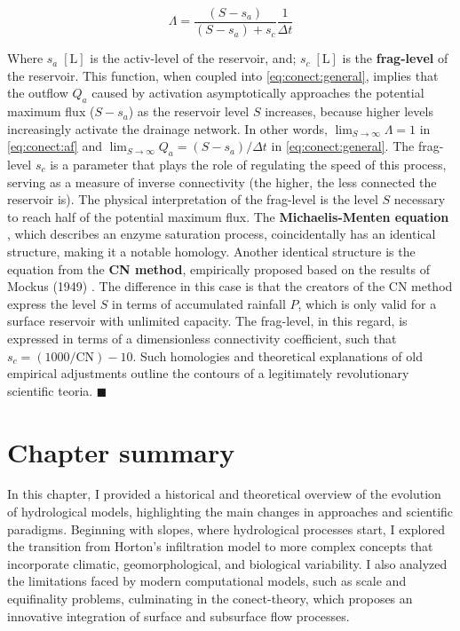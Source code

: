 \documentclass[./main_en.tex]{subfiles}
\begin{document}
\begin{linenomath*}
\begin{equation} 
	\label{eq:conect:af}
	\Lambda = \frac{(S - s_a)}{(S - s_a) + s_c} \frac{1}{\Delta t}
\end{equation}
\end{linenomath*}
Where $s_{a}\;[\text{L}]$ is the \gls{activ-level} of the reservoir, and;  $s_{c}\;[\text{L}]$ is the \textbf{\gls{frag-level}} of the reservoir. This function, when coupled into \eqref{eq:conect:general}, implies that the outflow $Q_a$ caused by activation asymptotically approaches the potential maximum flux ($S - s_a$) as the reservoir level $S$ increases, because higher levels increasingly activate the drainage network. In other words, $\lim _{S \to \infty} \Lambda= 1$ in \eqref{eq:conect:af} and $\lim _{S \to \infty} Q_a = (S - s_a)/ \Delta t$ in \eqref{eq:conect:general}. The \gls{frag-level} $s_c$ is a parameter that plays the role of regulating the speed of this process, serving as a measure of inverse connectivity (the higher, the less connected the reservoir is). The physical interpretation of the \gls{frag-level} is the level $S$ necessary to reach half of the potential maximum flux. The \textbf{Michaelis-Menten equation} \cite{Johnson2011a}, which describes an enzyme saturation process, coincidentally has an identical structure, making it a notable \gls{homology}. Another identical structure is the equation from the \textbf{CN method}, empirically proposed based on the results of Mockus (1949) \cite{mockus1949}. The difference in this case is that the creators of the CN method express the level $S$ in terms of accumulated rainfall $P$, which is only valid for a surface reservoir with unlimited capacity. The \gls{frag-level}, in this regard, is expressed in terms of a dimensionless connectivity coefficient, such that $s_c = (1000/\text{CN}) - 10$. Such homologies and theoretical explanations of old empirical adjustments outline the contours of a legitimately revolutionary scientific \gls{teoria}. $\blacksquare$

\clearpage

\section{Chapter summary} \label{sec:hydro:summary}

\par In this chapter, I provided a historical and theoretical overview of the evolution of hydrological models, highlighting the main changes in approaches and scientific paradigms. Beginning with slopes, where hydrological processes start, I explored the transition from Horton’s infiltration model to more complex concepts that incorporate climatic, geomorphological, and biological variability. I also analyzed the limitations faced by modern computational models, such as scale and equifinality problems, culminating in the \gls{conect-theory}, which proposes an innovative integration of surface and subsurface flow processes.
\end{document}
